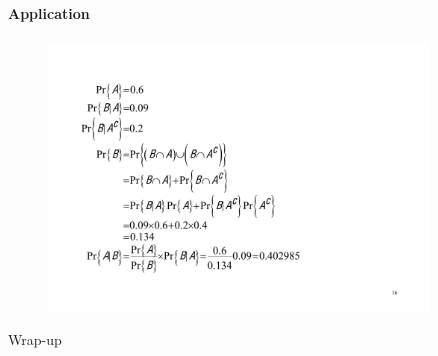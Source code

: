 \documentclass[notes=show,handout]{beamer}\usepackage[]{graphicx}\usepackage[]{color}
\begin{document}
\begin{frame}{\secname}
\framesubtitle{Application}
  \begin{example}[cont'd]
  \begin{figure}[h!]
  \centering
  \includegraphics[width=0.9\textwidth,height=0.65\textheight]{img/example9b.pdf}
  \end{figure}
  \end{example}
\end{frame}


\begin{frame}{Wrap-up}

\end{frame}
\end{document}

